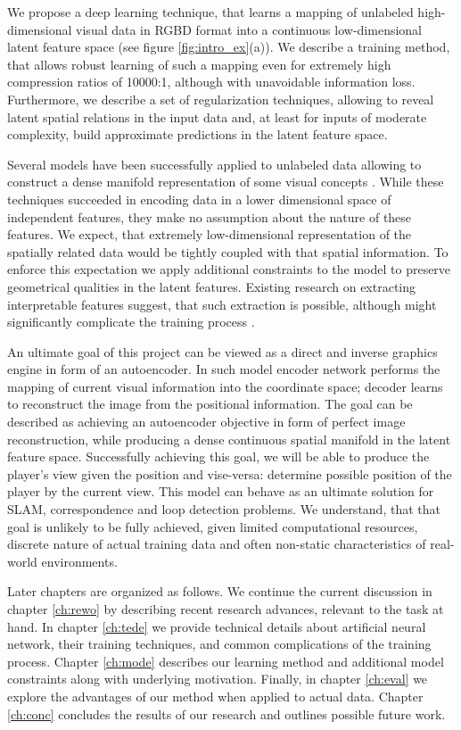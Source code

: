 We propose a deep learning technique, that learns a mapping of unlabeled high-dimensional visual data in RGBD format into a continuous low-dimensional latent feature space (see figure \ref{fig:intro_ex}(a)). We describe a training method, that allows robust learning of such a mapping even for extremely high compression ratios of 10000:1, although with unavoidable information loss. Furthermore, we describe a set of regularization techniques, allowing to reveal latent spatial relations in the input data and, at least for inputs of moderate complexity, build approximate predictions in the latent feature space.

Several models have been successfully applied to unlabeled data allowing to construct a dense manifold representation of some visual concepts \cite{Li2015, Kingma2013, Goodfellow2014}.
While these techniques succeeded in encoding data in a lower dimensional space of independent features, they make no assumption about the nature of these features.
We expect, that extremely low-dimensional representation of the spatially related data  would be tightly coupled with that spatial information.
To enforce this expectation we apply additional constraints to the model to preserve geometrical qualities in the latent features.
Existing research on extracting interpretable features suggest, that such extraction is possible, although might significantly complicate the training process \cite{Lei2016, Kulkarni2015}.

An ultimate goal of this project can be viewed as a direct and inverse graphics engine in form of an autoencoder. In such model encoder network performs the mapping of current visual information into the coordinate space; decoder learns to reconstruct the image from the positional information.
The goal can be described as achieving an autoencoder objective in form of perfect image reconstruction, while producing a dense continuous spatial manifold in the latent feature space.
Successfully achieving this goal, we will be able to produce the player's view given the position and vise-versa: determine possible position of the player by the current view.
This model can behave as an ultimate solution for SLAM, correspondence and loop detection problems.
We understand, that that goal is unlikely to be fully achieved, given limited computational resources, discrete nature of actual training data and often non-static characteristics of real-world environments.

Later chapters are organized as follows.
We continue the current discussion in chapter \ref{ch:rewo} by describing recent research advances, relevant to the task at hand.
In chapter \ref{ch:tede} we provide technical details about artificial neural network, their training techniques, and common complications of the training process.
Chapter \ref{ch:mode} describes our learning method and additional model constraints along with underlying motivation.
Finally, in chapter \ref{ch:eval} we explore the advantages of our method when applied to actual data.
Chapter \ref{ch:conc} concludes the results of our research and outlines possible future work.
